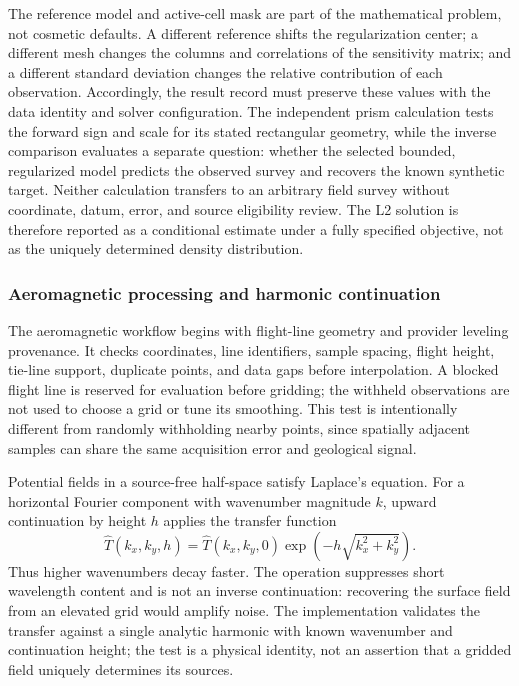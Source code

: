 The reference model and active-cell mask are part of the mathematical
problem, not cosmetic defaults. A different reference shifts the
regularization center; a different mesh changes the columns and
correlations of the sensitivity matrix; and a different standard
deviation changes the relative contribution of each observation.
Accordingly, the result record must preserve these values with the data
identity and solver configuration. The independent prism calculation
tests the forward sign and scale for its stated rectangular geometry,
while the inverse comparison evaluates a separate question: whether the
selected bounded, regularized model predicts the observed survey and
recovers the known synthetic target. Neither calculation transfers to
an arbitrary field survey without coordinate, datum, error, and source
eligibility review. The L2 solution is therefore reported as a
conditional estimate under a fully specified objective, not as the
uniquely determined density distribution.

\subsubsection{Aeromagnetic processing and harmonic continuation}
\label{method-aeromagnetic-processing}

The aeromagnetic workflow begins with flight-line geometry and provider
leveling provenance. It checks coordinates, line identifiers, sample
spacing, flight height, tie-line support, duplicate points, and data
gaps before interpolation. A blocked flight line is reserved for
evaluation before gridding; the withheld observations are not used to
choose a grid or tune its smoothing. This test is intentionally
different from randomly withholding nearby points, since spatially
adjacent samples can share the same acquisition error and geological
signal.

Potential fields in a source-free half-space satisfy Laplace's equation.
For a horizontal Fourier component with wavenumber magnitude $k$,
upward continuation by height $h$ applies the transfer function
\begin{equation}
  \widehat{T}(k_x,k_y,h) = \widehat{T}(k_x,k_y,0)\exp(-h\sqrt{k_x^2+k_y^2}).
  \label{eq:magnetic-continuation}
\end{equation}
Thus higher wavenumbers decay faster. The operation suppresses short
wavelength content and is not an inverse continuation: recovering the
surface field from an elevated grid would amplify noise. The implementation
validates the transfer against a single analytic harmonic with known
wavenumber and continuation height; the test is a physical identity,
not an assertion that a gridded field uniquely determines its sources.

